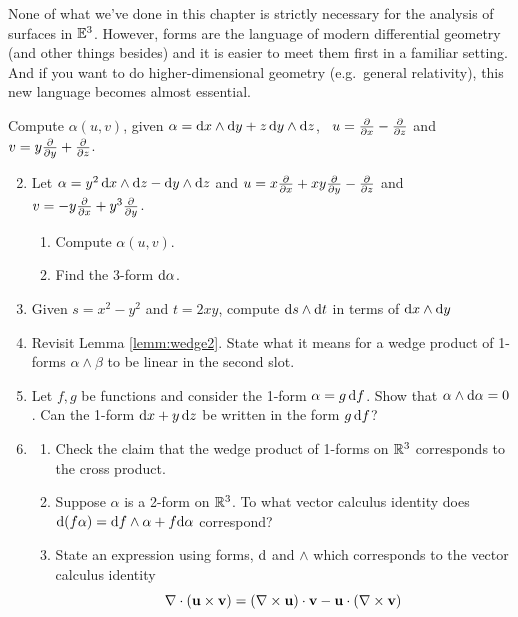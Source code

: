 
None of what we've done in this chapter is strictly necessary for the analysis of surfaces in $\mathbb{E}^3$. However, forms are the language of modern differential geometry (and other things besides) and it is easier to meet them first in a familiar setting. And if you want to do higher-dimensional geometry (e.g.\ general relativity), this new language becomes almost essential.



\begin{exercises}
\exstart Compute $\alpha(u,v)$, given $\alpha={\mathrm{d} x}\wedge{\mathrm{d}y}+z\,{\mathrm{d} y}\wedge{\mathrm{d}z}$, \ $u=\frac{\partial }{\partial x}-\frac{\partial }{\partial z}$ and $v=y\frac{\partial }{\partial y}+\frac{\partial }{\partial z}$.\vspace{-3pt}

\begin{enumerate}\setcounter{enumi}{1}
  \item Let $\alpha=y^2\,{\mathrm{d} x}\wedge{\mathrm{d}z}-{\mathrm{d} y}\wedge{\mathrm{d}z}$ and $u=x\frac{\partial }{\partial x}+xy\frac{\partial }{\partial y}-\frac{\partial }{\partial z}$ and $v=-y\frac{\partial }{\partial x}+y^3\frac{\partial }{\partial y}$.
	\begin{enumerate}
	  \item Compute $\alpha(u,v)$.
	  \item Find the 3-form $\mathrm{d}\alpha$.
	\end{enumerate}
	
	
	\item Given $s=x^2-y^2$ and $t=2xy$, compute ${\mathrm{d} s}\wedge{\mathrm{d}t}$ in terms of ${\mathrm{d} x}\wedge{\mathrm{d}y}$
	
	
	\item Revisit Lemma \ref{lemm:wedge2}. State what it means for a wedge product of 1-forms $\alpha\wedge\beta$ to be linear in the second slot.
	
	
	\item Let $f,g$ be functions and consider the 1-form $\alpha=g\,{\mathrm{d} f}$. Show that $\alpha\wedge\mathrm{d}\alpha=0$. Can the 1-form ${\mathrm{d} x}+y\,{\mathrm{d} z}$ be written in the form $g\,{\mathrm{d} f}$?
	
	
	\item\begin{enumerate}
	  \item Check the claim that the wedge product of 1-forms on $\mathbb{R}^3$ corresponds to the cross product.
	  \item Suppose $\alpha$ is a 2-form on $\mathbb{R}^3$. To what vector calculus identity does $\mathrm{d}(f\alpha)={\mathrm{d} f}\wedge\alpha+f\mathrm{d}\alpha$ correspond?
	  \item State an expression using forms, $\mathrm{d}$ and $\wedge$ which corresponds to the vector calculus identity
	  \[\nabla\cdot({\mathbf{u}}\times{\mathbf{v}}) =(\nabla\times{\mathbf{u}})\cdot{\mathbf{v}}-{\mathbf{u}}\cdot(\nabla\times{\mathbf{v}})\]
	\end{enumerate}
	

\end{enumerate}
\end{exercises}

